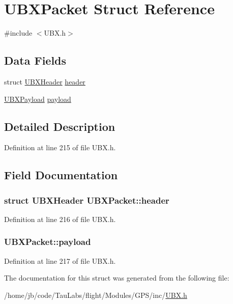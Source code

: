 \hypertarget{struct_u_b_x_packet}{\section{\-U\-B\-X\-Packet \-Struct \-Reference}
\label{struct_u_b_x_packet}
}


{\ttfamily \#include $<$\-U\-B\-X.\-h$>$}

\subsection*{\-Data \-Fields}
\begin{DoxyCompactItemize}
\item 
struct \hyperlink{struct_u_b_x_header}{\-U\-B\-X\-Header} \hyperlink{struct_u_b_x_packet_aa1e79029fc57ab8ba520dfaf0c66f660}{header}
\item 
\hyperlink{union_u_b_x_payload}{\-U\-B\-X\-Payload} \hyperlink{struct_u_b_x_packet_a863aa6b84efd85ac358894c6cdfc6883}{payload}
\end{DoxyCompactItemize}


\subsection{\-Detailed \-Description}


\-Definition at line 215 of file \-U\-B\-X.\-h.



\subsection{\-Field \-Documentation}
\hypertarget{struct_u_b_x_packet_aa1e79029fc57ab8ba520dfaf0c66f660}{
\subsubsection[{header}]{\setlength{\rightskip}{0pt plus 5cm}struct {\bf \-U\-B\-X\-Header} {\bf \-U\-B\-X\-Packet\-::header}}}\label{struct_u_b_x_packet_aa1e79029fc57ab8ba520dfaf0c66f660}


\-Definition at line 216 of file \-U\-B\-X.\-h.

\hypertarget{struct_u_b_x_packet_a863aa6b84efd85ac358894c6cdfc6883}{
\subsubsection[{payload}]{ {\bf \-U\-B\-X\-Packet\-::payload}}}\label{struct_u_b_x_packet_a863aa6b84efd85ac358894c6cdfc6883}


\-Definition at line 217 of file \-U\-B\-X.\-h.



\-The documentation for this struct was generated from the following file\-:\begin{DoxyCompactItemize}
\item 
/home/jb/code/\-Tau\-Labs/flight/\-Modules/\-G\-P\-S/inc/\hyperlink{_u_b_x_8h}{\-U\-B\-X.\-h}\end{DoxyCompactItemize}
